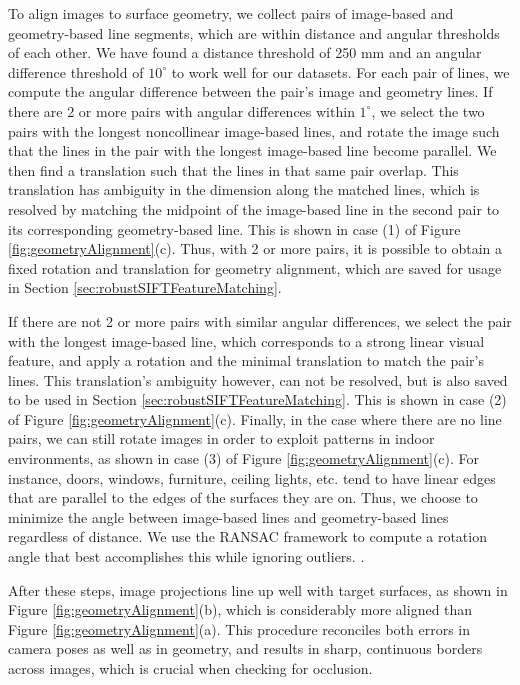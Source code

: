 \documentclass[]{spie}  %
\begin{document}
To align images to surface geometry, we collect pairs of image-based
and geometry-based line segments, which are within distance and
angular thresholds of each other. We have found a distance threshold
of 250 mm and an angular difference threshold of $10^\circ$ to work
well for our datasets. For each pair of lines, we compute the angular
difference between the pair's image and geometry lines. If there are 2
or more pairs with angular differences within $1^\circ$, we select the
two pairs with the longest noncollinear image-based lines, and rotate
the image such that the lines in the pair with the longest image-based
line become parallel. We then find a translation such that the lines
in that same pair overlap. This translation has ambiguity in the
dimension along the matched lines, which is resolved by matching the
midpoint of the image-based line in the second pair to its
corresponding geometry-based line. This is shown in case (1) of Figure
\ref{fig:geometryAlignment}(c). Thus, with 2 or more pairs, it is
possible to obtain a fixed rotation and translation for geometry
alignment, which are saved for usage in Section
\ref{sec:robustSIFTFeatureMatching}.

If there are not 2 or more pairs with similar angular differences, we
select the pair with the longest image-based line, which corresponds
to a strong linear visual feature, and apply a rotation and the
minimal translation to match the pair's lines. This translation's
ambiguity however, can not be resolved, but is also saved to be used
in Section \ref{sec:robustSIFTFeatureMatching}. This is shown in case
(2) of Figure \ref{fig:geometryAlignment}(c). Finally, in the case
where there are no line pairs, we can still rotate images in order to
exploit patterns in indoor environments, as shown in case (3) of
Figure \ref{fig:geometryAlignment}(c). For instance, doors, windows,
furniture, ceiling lights, etc. tend to have linear edges that are
parallel to the edges of the surfaces they are on. Thus, we choose to
minimize the angle between image-based lines and geometry-based lines
regardless of distance. We use the RANSAC framework to compute a
rotation angle that best accomplishes this while ignoring
outliers. \cite{fischler1981random}.

After these steps, image projections line up well with target
surfaces, as shown in Figure \ref{fig:geometryAlignment}(b), which is
considerably more aligned than Figure
\ref{fig:geometryAlignment}(a). This procedure reconciles both errors
in camera poses as well as in geometry, and results in sharp,
continuous borders across images, which is crucial when checking for
occlusion.
\end{document}
